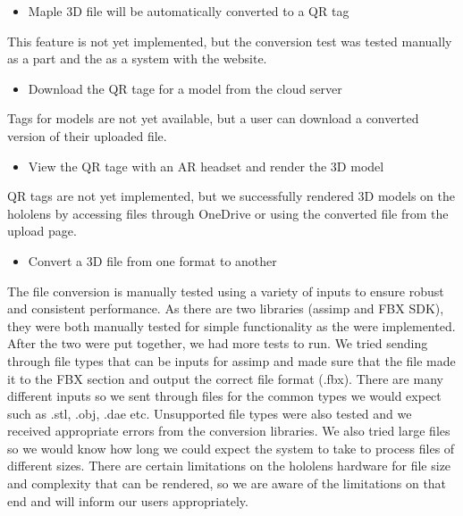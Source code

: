 \begin{itemize} \item Maple 3D file will be automatically converted to a QR tag \end{itemize}
    \hspace{7mm}
    This feature is not yet implemented, but the conversion test was tested manually as a part and the as a system with the website.

\begin{itemize} \item Download the QR tage for a model from the cloud server \end{itemize}
    \hspace{7mm}
    Tags for models are not yet available, but a user can download a converted version of their uploaded file.

\begin{itemize} \item View the QR tage with an AR headset and render the 3D model \end{itemize}
    \hspace{7mm} 
    QR tags are not yet implemented, but we successfully rendered 3D models on the hololens by accessing files through OneDrive or using the converted file from the upload page.

\begin{itemize} \item Convert a 3D file from one format to another 
    \end{itemize}
    \hspace{7mm}
    The file conversion is manually tested using a variety of inputs to ensure robust and consistent performance. As there are two libraries (assimp and FBX SDK), they were both manually tested for simple functionality as the were implemented. After the two were put together, we had more tests to run. We tried sending through file types that can be inputs for assimp and made sure that the file made it to the FBX section and output the correct file format (.fbx). There are many different inputs so we sent through files for the common types we would expect such as .stl, .obj, .dae etc. Unsupported file types were also tested and we received appropriate errors from the conversion libraries. We also tried large files so we would know how long we could expect the system to take to process files of different sizes. There are certain limitations on the hololens hardware for file size and complexity that can be rendered, so we are aware of the limitations on that end and will inform our users appropriately. 
    

